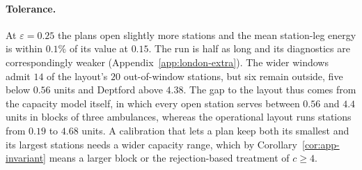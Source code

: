 \paragraph{Tolerance.}
At $\varepsilon = 0.25$ the plans open slightly more stations and the mean station-leg energy is within $0.1\%$ of its value at $0.15$. The run is half as long and its diagnostics are correspondingly weaker (Appendix~\ref{app:london-extra}). The wider windows admit $14$ of the layout's $20$ out-of-window stations, but six remain outside, five below $0.56$ units and Deptford above $4.38$. The gap to the layout thus comes from the capacity model itself, in which every open station serves between $0.56$ and $4.4$ units in blocks of three ambulances, whereas the operational layout runs stations from $0.19$ to $4.68$ units. A calibration that lets a plan keep both its smallest and its largest stations needs a wider capacity range, which by Corollary~\ref{cor:app-invariant} means a larger block or the rejection-based treatment of $c \ge 4$.
